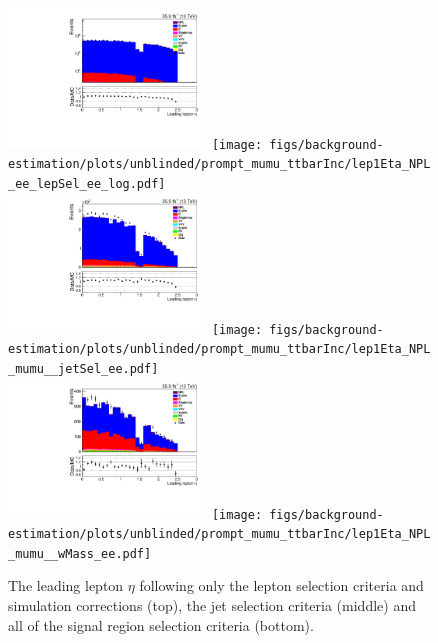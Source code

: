\begin{figure}[h]
\centering
\includegraphics[width=0.47\textwidth]{figs/background-estimation/plots/unblinded/prompt_ee_ttbarInc/lep1Eta_NPL_ee_lepSel_ee_log.pdf}
\texttt{[image: figs/background-estimation/plots/unblinded/prompt\_mumu\_ttbarInc/lep1Eta\_NPL\_ee\_lepSel\_ee\_log.pdf]}
\\
\includegraphics[width=0.47\textwidth]{figs/background-estimation/plots/unblinded/prompt_ee_ttbarInc/lep1Eta_NPL_ee_jetSel_ee.pdf}
\texttt{[image: figs/background-estimation/plots/unblinded/prompt\_mumu\_ttbarInc/lep1Eta\_NPL\_mumu\_\_jetSel\_ee.pdf]}
\\
\includegraphics[width=0.47\textwidth]{figs/background-estimation/plots/unblinded/prompt_ee_ttbarInc/lep1Eta_NPL_ee_wMass_ee.pdf}
\texttt{[image: figs/background-estimation/plots/unblinded/prompt\_mumu\_ttbarInc/lep1Eta\_NPL\_mumu\_\_wMass\_ee.pdf]}
\caption{
The leading lepton $\eta$ following only the lepton selection criteria and simulation corrections (top), the jet selection criteria (middle) and all of the signal region selection criteria (bottom).
}
\label{fig:SR_lep1Eta}
\end{figure}

